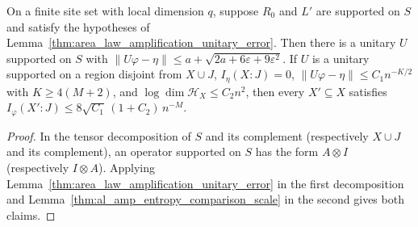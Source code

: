 \begin{lemma}
    \label{thm:al_amp_supported_polar}
    \leanok
    On a finite site set with local dimension $q$, suppose $R_0$ and $L'$ are
    supported on $S$ and satisfy the hypotheses of
    Lemma~\ref{thm:area_law_amplification_unitary_error}. Then there is a
    unitary $U$ supported on $S$ with
    $\|U\varphi-\eta\|\le a+\sqrt{2a+6\varepsilon+9\varepsilon^2}$. If $U$ is a
    unitary supported on a region disjoint from $X\cup J$, $I_\eta(X:J)=0$,
    $\|U\varphi-\eta\|\le C_1n^{-K/2}$ with $K\ge4(M+2)$, and
    $\log\dim\mathcal H_X\le C_2n^2$, then every $X'\subseteq X$ satisfies
    $I_\varphi(X':J)\le 8\sqrt{C_1}\,(1+C_2)\,n^{-M}$.
\end{lemma}
\begin{proof}
    \leanok
    In the tensor decomposition of $S$ and its complement (respectively
    $X\cup J$ and its complement), an operator supported on $S$ has the form
    $A\otimes I$ (respectively $I\otimes A$). Applying
    Lemma~\ref{thm:area_law_amplification_unitary_error} in the first
    decomposition and Lemma~\ref{thm:al_amp_entropy_comparison_scale} in the
    second gives both claims.
\end{proof}

